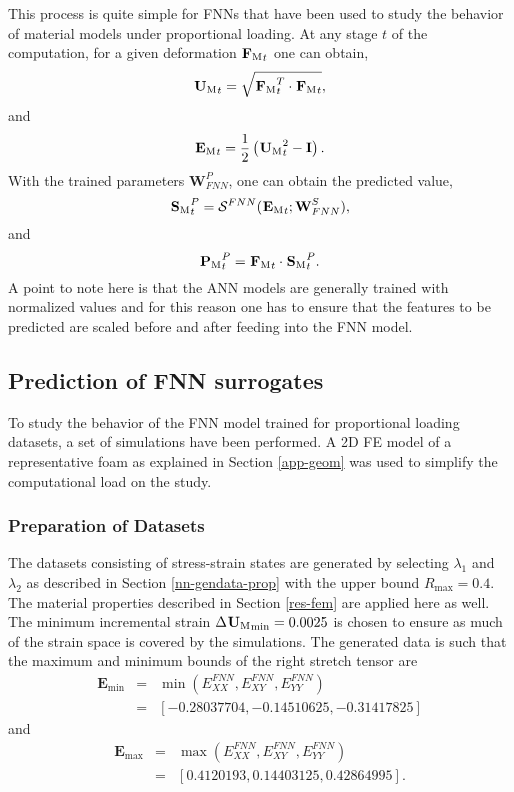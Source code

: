 This process is quite simple for FNNs that have been used to study the behavior of material models under proportional loading. At any stage $ t $ of the computation, for a given deformation $ {^{}\textbf{F}_\text{M}}_t $ one can obtain,
\begin{equation}\label{eq-fnn-1}
{^{}\textbf{U}_\text{M}}_t=\sqrt{{^{}\textbf{F}_\text{M}}_t^T\cdot{^{}\textbf{F}_\text{M}}_t},
\end{equation}
and 
\begin{equation}\label{eq-fnn-2}
{^{}\textbf{E}_\text{M}}_t=\frac{1}{2}\left({^{}\textbf{U}_\text{M}}_t^2-\textbf{I}\right).
\end{equation}
With the trained parameters $ \textbf{W}^P_{FNN} $, one can obtain the predicted value,
\begin{equation}\label{eq-fnn-3}
{^{}\textbf{S}_\text{M}}_t^P=\mathcal{S}^{FNN}({^{}\textbf{E}_\text{M}}_t;\textbf{W}^S_{FNN}),
\end{equation}
and
\begin{equation}\label{eq-fnn-4}
{^{}\textbf{P}_\text{M}}_t^P={^{}\textbf{F}_\text{M}}_t\cdot{^{}\textbf{S}_\text{M}}_t^P.
\end{equation}
A point to note here is that the ANN models are generally trained with normalized values and for this reason one has to ensure that the features to be predicted are scaled before and after feeding into the FNN model.

\subsection{Prediction of FNN surrogates}\label{nn-mono-results}
To study the behavior of the FNN model trained for proportional loading datasets, a set of simulations have been performed. A 2D FE model of a representative foam as explained in Section \ref{app-geom} was used to simplify the computational load on the study. 

\subsubsection{Preparation of Datasets}
The datasets consisting of stress-strain states are generated by selecting $ \lambda_1 $ and $ \lambda_2 $ as described in Section \ref{nn-gendata-prop} with the upper bound $ R_\text{max}=0.4 $. The material properties described in Section \ref{res-fem} are applied here as well. The minimum incremental strain $ \Delta{^{}\textbf{U}_\text{M}}_\text{min}=0.0025 $ is chosen to ensure as much of the strain space is covered by the simulations. The generated data is such that the maximum and minimum bounds of the right stretch tensor are
\begin{eqnarray}\label{eq-fnn-res1}
\textbf{E}_\text{min}&=&\min\left(E_{XX}^{FNN},E_{XY}^{FNN},E_{YY}^{FNN}\right)\nonumber\\&=&\left[-0.28037704, -0.14510625, -0.31417825\right]\nonumber
\end{eqnarray}
and
\begin{eqnarray}\label{eq-fnn-res2}
\textbf{E}_\text{max}&=&\max\left(E_{XX}^{FNN},E_{XY}^{FNN},E_{YY}^{FNN}\right)\nonumber\\&=&\left[0.4120193 , 0.14403125, 0.42864995\right].\nonumber
\end{eqnarray}


